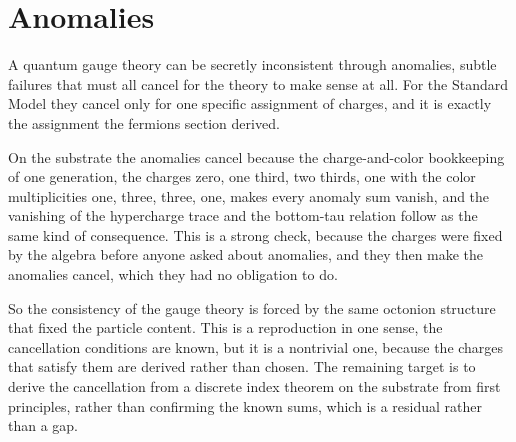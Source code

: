\section{Anomalies}

A quantum gauge theory can be secretly inconsistent through anomalies, subtle failures that must all cancel for the theory
to make sense at all. For the Standard Model they cancel only for one specific assignment of charges, and it is exactly
the assignment the fermions section derived.

On the substrate the anomalies cancel because the charge-and-color bookkeeping of one generation, the charges zero, one
third, two thirds, one with the color multiplicities one, three, three, one, makes every anomaly sum vanish, and the
vanishing of the hypercharge trace and the bottom-tau relation follow as the same kind of consequence. This is a strong
check, because the charges were fixed by the algebra before anyone asked about anomalies, and they then make the
anomalies cancel, which they had no obligation to do.

So the consistency of the gauge theory is forced by the same octonion structure that fixed the particle content. This is
a reproduction in one sense, the cancellation conditions are known, but it is a nontrivial one, because the charges that
satisfy them are derived rather than chosen. The remaining target is to derive the cancellation from a
discrete index theorem on the substrate from first principles, rather than confirming the known sums, which is a residual
rather than a gap.
